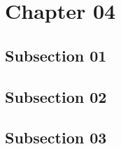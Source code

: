 \section{Chapter 04}
\subsection{Subsection 01}
\lipsum[1-5]
\subsection{Subsection 02}
\lipsum[1-5]
\subsection{Subsection 03}
\lipsum[1-5]
